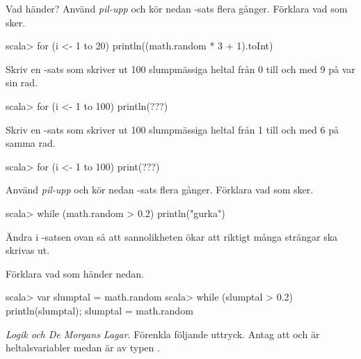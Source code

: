 {{{{{{{\Subtask Vad händer? Använd \textit{pil-upp} och kör nedan -sats flera gånger. Förklara vad som sker.

\begin{REPLnonum}
scala> for (i <- 1 to 20) println((math.random * 3 + 1).toInt)
\end{REPLnonum}

\Subtask Skriv en -sats som skriver ut 100 slumpmässiga heltal från 0 till och med 9 på var sin rad.

\begin{REPLnonum}
scala> for (i <- 1 to 100) println(???)
\end{REPLnonum}

\Subtask Skriv en -sats som skriver ut 100 slumpmässiga heltal från 1 till och med 6 på samma rad.

\begin{REPLnonum}
scala> for (i <- 1 to 100) print(???)
\end{REPLnonum}


\Subtask Använd \textit{pil-upp} och kör nedan -sats flera gånger. Förklara vad som sker.

\begin{REPLnonum}
scala> while (math.random > 0.2) println("gurka")
\end{REPLnonum}

\Subtask Ändra i -satsen ovan så att sannolikheten ökar att riktigt många strängar ska skrivas ut.

\Subtask Förklara vad som händer nedan.
\begin{REPL}
scala> var slumptal = math.random
scala> while (slumptal > 0.2) { println(slumptal); slumptal = math.random }
\end{REPL}

\Task\Pen \textit{Logik och De Morgans Lagar}. Förenkla följande uttryck. Antag att  och  är heltalsvariabler medan  är av typen .

\Subtask {}

\Subtask {}

\Subtask {}

\Subtask {}

\Subtask {}

\Subtask {}

\Subtask {}


}}}}}}}
